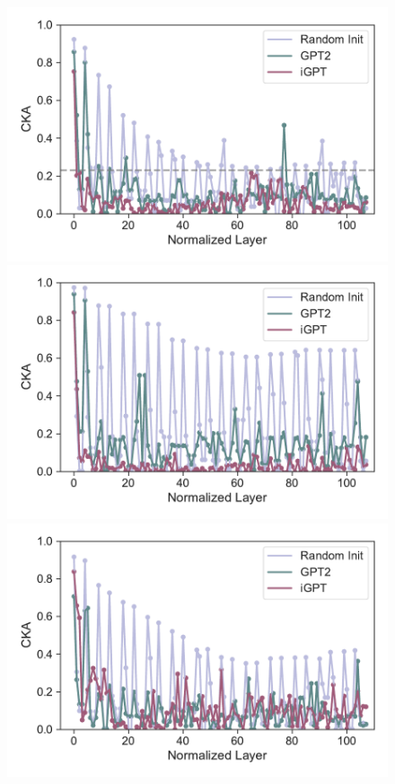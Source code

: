 \begin{figure}[h]
    \centering
    \begin{minipage}[b]{0.32\linewidth}
        \includegraphics[width=\linewidth]{figs/cka_plot_40_gpt2_igpt_dt_hopper_medium_666_state.pdf}
    \end{minipage}
    \begin{minipage}[b]{0.32\linewidth}
        \includegraphics[width=\linewidth]{figs/cka_plot_40_gpt2_igpt_dt_halfcheetah_medium_666_state.pdf}
    \end{minipage}
    \begin{minipage}[b]{0.32\linewidth}
        \includegraphics[width=\linewidth]{figs/cka_plot_40_gpt2_igpt_dt_walker2d_medium_666_state.pdf}

\end{minipage}
\end{figure}

